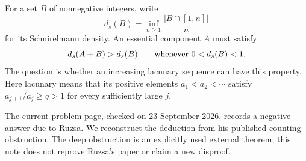 For a set $B$ of nonnegative integers, write
\[
 d_s(B)=\inf_{n\geq1}\frac{|B\cap[1,n]|}{n}
\]
for its Schnirelmann density. An essential component $A$ must satisfy
\[
 d_s(A+B)>d_s(B)\qquad\hbox{whenever }0<d_s(B)<1.
\]
The question is whether an increasing lacunary sequence can have this
property. Here lacunary means that its positive elements
$a_1<a_2<\cdots$ satisfy $a_{j+1}/a_j\geq q>1$ for every sufficiently
large $j$.

The current problem page, checked on 23 September 2026, records a
negative answer due to Ruzsa. We reconstruct the deduction from his
published counting obstruction. The deep obstruction is an explicitly
used external theorem; this note does not reprove Ruzsa's paper or
claim a new disproof.
